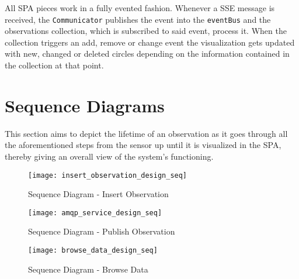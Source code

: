 All SPA pieces work in a fully evented fashion. Whenever a SSE message is received, the \texttt{Communicator} publishes the event into the \texttt{eventBus} and the observations collection, which is subscribed to said event, process it. When the collection triggers an add, remove or change event the visualization gets updated with new, changed or deleted circles depending on the information contained in the collection at that point.

\section{Sequence Diagrams}

This section aims to depict the lifetime of an observation as it goes through all the aforementioned steps from the sensor up until it is visualized in the SPA, thereby giving an overall view of the system's functioning.

\begin{sidewaysfigure}
	\texttt{[image: insert\_observation\_design\_seq]}
	\caption{Sequence Diagram - Insert Observation}
	\label{fig:insert_observation_design_seq}
\end{sidewaysfigure}

\begin{figure}[h]
	\centering
	\texttt{[image: amqp\_service\_design\_seq]}
	\caption{Sequence Diagram - Publish Observation}
	\label{fig:amqp_service_design_seq}
\end{figure}

\begin{figure}[h]
	\centering
	\texttt{[image: browse\_data\_design\_seq]}
	\caption{Sequence Diagram - Browse Data}
	\label{fig:browse_data_design_seq}
\end{figure}
